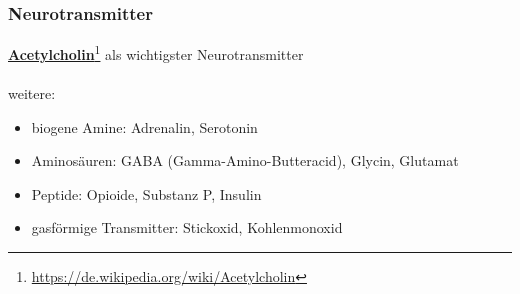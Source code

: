 \subsubsection{Neurotransmitter}
\textbf{\underline{Acetylcholin}}\footnote{\url{https://de.wikipedia.org/wiki/Acetylcholin}} als wichtigster Neurotransmitter\\\\
weitere:
\begin{itemize}
	\item biogene Amine: Adrenalin, Serotonin
	\item Aminosäuren: GABA (Gamma-Amino-Butteracid), Glycin, Glutamat
	\item Peptide: Opioide, Substanz P, Insulin
	\item gasförmige Transmitter: Stickoxid, Kohlenmonoxid
\end{itemize}

